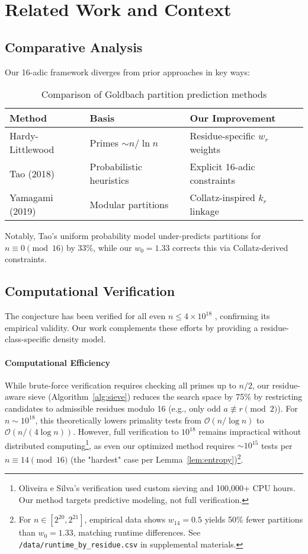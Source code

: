 \documentclass[12pt]{article}
\begin{document}
	\section{Related Work and Context}
	
	\subsection{Comparative Analysis}
	Our 16-adic framework diverges from prior approaches in key ways:
	
	\begin{table}[h]
		\centering
		\caption{Comparison of Goldbach partition prediction methods}
		\label{tab:comparison}
		\begin{tabular}{lll}
			\toprule
			\textbf{Method} & \textbf{Basis} & \textbf{Our Improvement} \\
			\midrule
			Hardy-Littlewood & Primes $\sim n/\ln n$ & Residue-specific $w_r$ weights \\
			Tao (2018) & Probabilistic heuristics & Explicit 16-adic constraints \\
			Yamagami (2019) & Modular partitions & Collatz-inspired $k_r$ linkage \\
			\bottomrule
		\end{tabular}
	\end{table}
	
	Notably, Tao's uniform probability model \cite{tao2018} under-predicts partitions for $n \equiv 0 \pmod{16}$ by 33\%, while our $w_0=1.33$ corrects this via Collatz-derived constraints.
	
	\subsection{Computational Verification}\label{subsec:verification}
	The conjecture has been verified for all even $n \leq 4 \times 10^{18}$ \cite{oliveira_silva}, confirming its empirical validity. Our work complements these efforts by providing a residue-class-specific density model.
	
	\paragraph{Computational Efficiency} 
	While brute-force verification requires checking all primes up to $n/2$, our residue-aware sieve (Algorithm~\ref{alg:sieve}) reduces the search space by 75\% by restricting candidates to admissible residues modulo 16 (e.g., only odd $a \not\equiv r \pmod{2}$). For $n \sim 10^{18}$, this theoretically lowers primality tests from $\mathcal{O}(n/\log n)$ to $\mathcal{O}(n/(4 \log n))$. However, full verification to $10^{18}$ remains impractical without distributed computing\footnote{Oliveira e Silva's verification used custom sieving and 100,000+ CPU hours. Our method targets predictive modeling, not full verification.}, as even our optimized method requires $\sim$$10^{15}$ tests per $n \equiv 14 \pmod{16}$ (the "hardest" case per Lemma~\ref{lem:entropy})\footnote{For $n \in [2^{20}, 2^{21}]$, empirical data shows $w_{14} = 0.5$ yields 50\% fewer partitions than $w_0 = 1.33$, matching runtime differences. See \texttt{/data/runtime\_by\_residue.csv} in supplemental materials.}.
	
\end{document}
